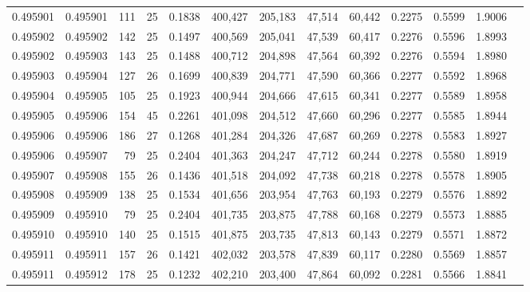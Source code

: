 \begin{tabular}{rrrrrrrrrrrrr}
0.495901 & 0.495901 & 111 &  25 &                                     0.1838 & 400,427 & 205,183 &  47,514 &  60,442 & 0.2275 & 0.5599 & 1.9006 \\
0.495902 & 0.495902 & 142 &  25 &                                     0.1497 & 400,569 & 205,041 &  47,539 &  60,417 & 0.2276 & 0.5596 & 1.8993 \\
0.495902 & 0.495903 & 143 &  25 &                                     0.1488 & 400,712 & 204,898 &  47,564 &  60,392 & 0.2276 & 0.5594 & 1.8980 \\
0.495903 & 0.495904 & 127 &  26 &                                     0.1699 & 400,839 & 204,771 &  47,590 &  60,366 & 0.2277 & 0.5592 & 1.8968 \\
0.495904 & 0.495905 & 105 &  25 &                                     0.1923 & 400,944 & 204,666 &  47,615 &  60,341 & 0.2277 & 0.5589 & 1.8958 \\
0.495905 & 0.495906 & 154 &  45 &                                     0.2261 & 401,098 & 204,512 &  47,660 &  60,296 & 0.2277 & 0.5585 & 1.8944 \\
0.495906 & 0.495906 & 186 &  27 &                                     0.1268 & 401,284 & 204,326 &  47,687 &  60,269 & 0.2278 & 0.5583 & 1.8927 \\
0.495906 & 0.495907 &  79 &  25 &                                     0.2404 & 401,363 & 204,247 &  47,712 &  60,244 & 0.2278 & 0.5580 & 1.8919 \\
0.495907 & 0.495908 & 155 &  26 &                                     0.1436 & 401,518 & 204,092 &  47,738 &  60,218 & 0.2278 & 0.5578 & 1.8905 \\
0.495908 & 0.495909 & 138 &  25 &                                     0.1534 & 401,656 & 203,954 &  47,763 &  60,193 & 0.2279 & 0.5576 & 1.8892 \\
0.495909 & 0.495910 &  79 &  25 &                                     0.2404 & 401,735 & 203,875 &  47,788 &  60,168 & 0.2279 & 0.5573 & 1.8885 \\
0.495910 & 0.495910 & 140 &  25 &                                     0.1515 & 401,875 & 203,735 &  47,813 &  60,143 & 0.2279 & 0.5571 & 1.8872 \\
0.495911 & 0.495911 & 157 &  26 &                                     0.1421 & 402,032 & 203,578 &  47,839 &  60,117 & 0.2280 & 0.5569 & 1.8857 \\
0.495911 & 0.495912 & 178 &  25 &                                     0.1232 & 402,210 & 203,400 &  47,864 &  60,092 & 0.2281 & 0.5566 & 1.8841 \\

\end{tabular}
